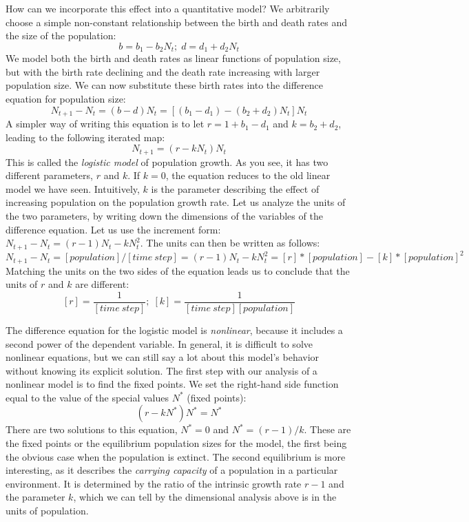 \documentclass[11pt]{book}
\begin{document}
How can we incorporate this effect into a quantitative model? We arbitrarily choose a simple non-constant relationship between the birth and death rates and the size of the population:
$$ b =  b_1 - b_2 N_t ; \;   d = d_1 + d_2 N_t  $$
We model both the birth and death rates as linear functions of population size, but with the birth rate declining and the death rate increasing with larger population size. We can now substitute these birth rates into the difference equation for population size:
$$N_{t+1} - N_t = (b -d)N_t = [(b_1 - d_1) - (b_2 + d_2)N_t] N_t $$
A simpler way of writing this equation is to let $r = 1 + b_1 - d_1$ and $k = b_2 + d_2$, leading to the following iterated map:
\begin{equation}
N_{t+1} = (r - k N_t) N_t
\label{discrete_logistic}
\end{equation}
This is called the \emph{logistic model} of population growth. As you see, it has two different parameters, $r$ and $k$. If $k = 0$, the equation reduces to the old linear model we have seen. Intuitively, $k$ is the parameter describing the effect of  increasing population on the population growth rate. Let us analyze the units of the two parameters, by writing down the dimensions of the variables of the difference equation. Let us use the increment form: $ N_{t+1} - N_t = (r-1)N_t - k N_t^2$. The units can then be written as follows:
$$ N_{t+1} - N_t = [population]/[time \ step] = (r-1) N_t - k N_t^2 = [r] *[population]  - [k] *[population]^2$$
Matching the units on the two sides of the equation leads us to conclude that the units of $r$ and $k$ are different:
$$ [r] = \frac{1}{[time \ step]} ; \; [k] =  \frac{1}{[time \ step] [population]} $$

The difference equation for the logistic model is \emph{nonlinear}, because it includes a second power of the dependent variable. In general, it is difficult to solve nonlinear equations, but we can still say a lot about this model's behavior without knowing its explicit solution. The first step with our analysis of a nonlinear model is to find the fixed points. We set the right-hand side function equal to the value of the special values $N^*$ (fixed points):
$$  (r - kN^*) N^* = N^*$$
There are two solutions to this equation, $N^* = 0$ and $N^* = (r-1)/k$. These are the fixed points or the equilibrium population sizes for the model, the first being the obvious case when the population is extinct. The second equilibrium is more interesting, as it describes the \emph{carrying capacity} of a population in a particular environment. It is determined by the ratio of the intrinsic growth rate $r-1$ and the parameter $k$, which we can tell by the dimensional analysis above is in the units of population.
\end{document}

